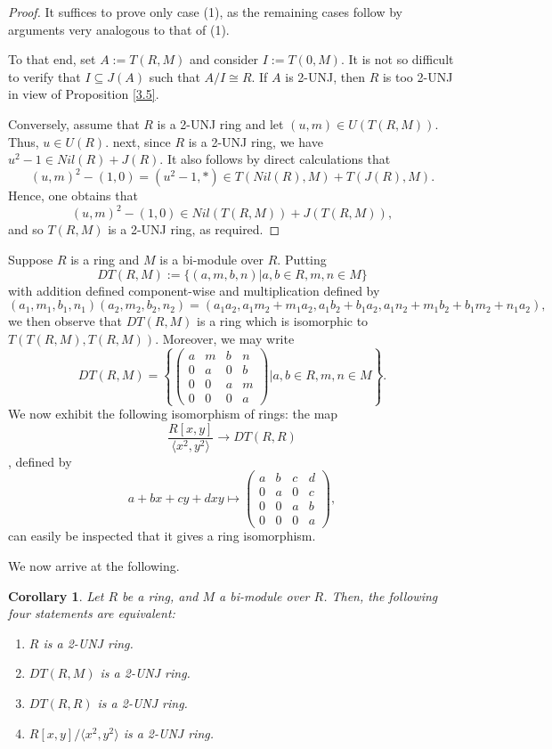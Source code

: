 \documentclass[12pt]{amsart}
\newtheorem{corollary}[theorem]{Corollary}
\theoremstyle{definition}
\begin{document}
\begin{proof}
It suffices to prove only case (1), as the remaining cases follow by arguments very analogous to that of (1). 

To that end, set $A:=T(R, M)$ and consider $I:=T(0, M)$. It is not so difficult to verify that $I\subseteq J(A)$ such that $A/I \cong R$. If $A$ is 2-UNJ, then $R$ is too 2-UNJ in view of Proposition \ref{3.5}. 

Conversely, assume that \( R \) is a 2-UNJ ring and let \( (u, m) \in U(T(R, M)) \). Thus, \( u \in U(R) \). next, since \( R \) is a 2-UNJ ring, we have \( u^2-1 \in Nil(R)+J(R) \). It also follows by direct calculations that
\[
(u, m)^2-(1, 0) = (u^2-1, \ast) \in T(Nil(R), M)+ T(J(R), M).
\]
Hence, one obtains that $$(u, m)^2-(1, 0)\in Nil(T(R, M))+J(T(R, M)),$$ and so \( T(R, M) \) is a 2-UNJ ring, as required.
\end{proof}

Suppose $R$ is a ring and $M$ is a bi-module over $R$. Putting $$DT(R,M) := \{ (a, m, b, n) | a, b \in R, m, n \in M \}$$ with addition defined component-wise and multiplication defined by $$(a_1, m_1, b_1, n_1)(a_2, m_2, b_2, n_2) = (a_1a_2, a_1m_2 + m_1a_2, a_1b_2 + b_1a_2, a_1n_2 + m_1b_2 + b_1m_2 +n_1a_2),$$ we then observe that $DT(R,M)$ is a ring which is isomorphic to $T(T(R, M), T(R, M))$. Moreover, we may write $$DT(R, M) =
\left\{\begin{pmatrix}
	a &m &b &n\\
	0 &a &0 &b\\
	0 &0 &a &m\\
	0 &0 &0 &a
\end{pmatrix} |  a,b \in R, m,n \in M\right\}.$$ We now exhibit the following isomorphism of rings: the map $$\dfrac{R[x, y]}{\langle x^2, y^2\rangle} \rightarrow DT(R, R)$$, defined by $$a + bx + cy + dxy \mapsto
\begin{pmatrix}
	a &b &c &d\\
	0 &a &0 &c\\
	0 &0 &a &b\\
	0 &0 &0 &a
\end{pmatrix},$$ can easily be inspected that it gives a ring isomorphism.

\medskip

We now arrive at the following.

\begin{corollary}
Let $R$ be a ring, and $M$ a bi-module over $R$. Then, the following four statements are equivalent:
\begin{enumerate}
\item
$R$ is a 2-UNJ ring.
\item
$DT(R, M)$ is a 2-UNJ ring.
\item
$DT(R, R)$ is a 2-UNJ ring.
\item
$R[x, y]/\langle x^2, y^2\rangle$ is a 2-UNJ ring.
\end{enumerate}
\end{corollary}
\end{document}
